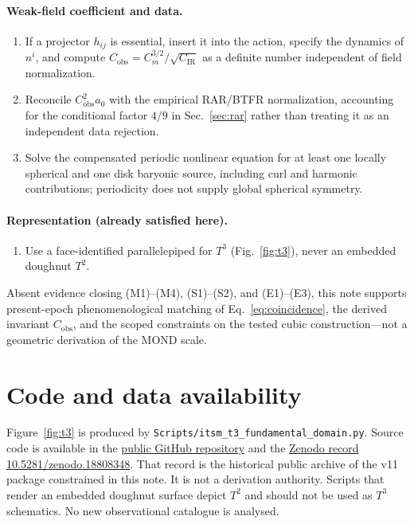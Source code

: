 \documentclass[aps,prd,reprint,superscriptaddress,nofootinbib,floatfix,showkeys]{revtex4-2}
\newcommand{\Tthree}{T^{3}}
\newcommand{\Ttwo}{T^{2}}
\newcommand{\Cobs}{C_{\mathrm{obs}}}
\newcommand{\Cm}{C_{m}}
\newcommand{\CIR}{C_{\mathrm{IR}}}
\newcommand{\azero}{a_{0}}
\begin{document}
\paragraph{Weak-field coefficient and data.}
\begin{enumerate}
\item[(E1)] If a projector \(h_{ij}\) is essential, insert it into the action,
  specify the dynamics of \(n^{i}\), and compute
  \(\Cobs=\Cm^{3/2}/\sqrt{\CIR}\)
  as a definite number independent of field normalization.
\item[(E2)] Reconcile \(\Cobs^{2}\azero\) with the empirical RAR/BTFR
  normalization, accounting for the conditional factor \(4/9\) in
  Sec.~\ref{sec:rar} rather than treating it as an independent data rejection.
\item[(E3)] Solve the compensated periodic nonlinear equation for at least one
  locally spherical and one disk baryonic source, including curl and harmonic
  contributions; periodicity does not supply global spherical symmetry.
\end{enumerate}

\paragraph{Representation (already satisfied here).}
\begin{enumerate}
\item[(R1)] Use a face-identified parallelepiped for \(\Tthree\)
  (Fig.~\ref{fig:t3}), never an embedded doughnut \(\Ttwo\).
\end{enumerate}

Absent evidence closing (M1)--(M4), (S1)--(S2), and (E1)--(E3), this note
supports present-epoch phenomenological matching of
Eq.~\eqref{eq:coincidence}, the derived invariant \(\Cobs\), and the scoped
constraints on the tested cubic construction---not a geometric derivation of
the MOND scale.

\section*{Code and data availability}

\begingroup
\raggedright
Figure~\ref{fig:t3} is produced by
\texttt{Scripts/itsm\_t3\_fundamental\_domain.py}.
Source code is available in the
\href{https://github.com/brendohxd/ITSM-Integrated-Toroidal-Syntropic-Model}{public GitHub repository}
and the \href{https://doi.org/10.5281/zenodo.18808348}{Zenodo record 10.5281/zenodo.18808348}.
That record is the historical public archive of the v11 package
constrained in this note. It is not a derivation authority.
Scripts that render an embedded doughnut surface depict \(\Ttwo\) and should
not be used as \(\Tthree\) schematics.  No new observational catalogue is
analysed.
\par
\endgroup
\end{document}
